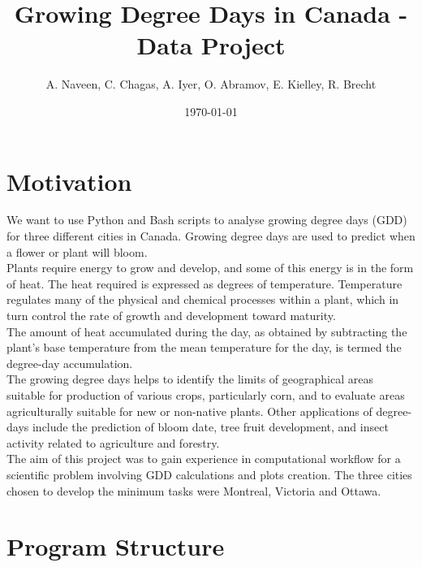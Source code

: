 \documentclass[12pt]{article}
\title{Growing Degree Days in Canada - Data Project}
\author{A. Naveen, C. Chagas, A. Iyer, O. Abramov, E. Kielley, R. Brecht}
\date{\today}
\begin{document}
\maketitle
\vspace{20pt}%
\tableofcontents
\pagebreak
\section{Motivation}
We want to use Python and Bash scripts to analyse growing degree days (GDD) for 
three different cities in Canada. Growing degree days are used to predict when a 
flower or plant will bloom. 
\\ Plants require energy to grow and develop, and some of this energy is in the 
form of heat. The heat required is expressed as degrees of temperature. 
Temperature regulates many of the physical and chemical processes within a 
plant, which in turn control the rate of growth and development toward maturity. 
\\The amount of heat accumulated during the day, as obtained by subtracting the
 plant's base temperature from the mean temperature for the day, is termed the
 degree-day accumulation.
\\The growing degree days helps to identify the limits of geographical areas 
suitable for production of various crops, particularly corn, and to evaluate 
areas agriculturally suitable for new or non-native plants. Other applications
of degree-days include the prediction of bloom date, tree fruit development, and
insect activity related to agriculture and forestry.
\\The aim of this project was to gain experience in computational workflow for a
scientific problem involving GDD calculations and plots creation. The three cities 
chosen to develop the minimum tasks were Montreal, Victoria and Ottawa.


\pagebreak

\section{Program Structure}
\end{document}
